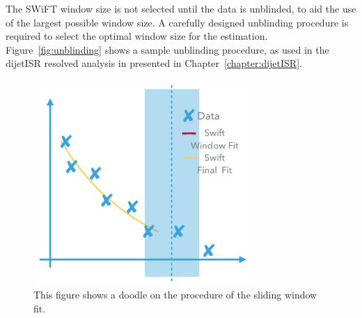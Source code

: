 The SWiFT window size is not selected until the data is unblinded, to aid the use of the largest possible window size. A carefully designed unblinding procedure is required to select the optimal window size for the estimation. Figure~\ref{fig:unblinding} shows a sample unblinding procedure, as used in the dijetISR resolved analysis in presented in Chapter~\ref{chapter:dijetISR}.

\begin{figure}[!htb]
    \begin{center}
        \includegraphics[width=0.75\textwidth]{figures/chapter_analysismethod/swift2}
        \caption{
            This figure shows a doodle on the procedure of the sliding window fit. 
        }
        \label{fig:swift}
    \end{center}
\end{figure}

